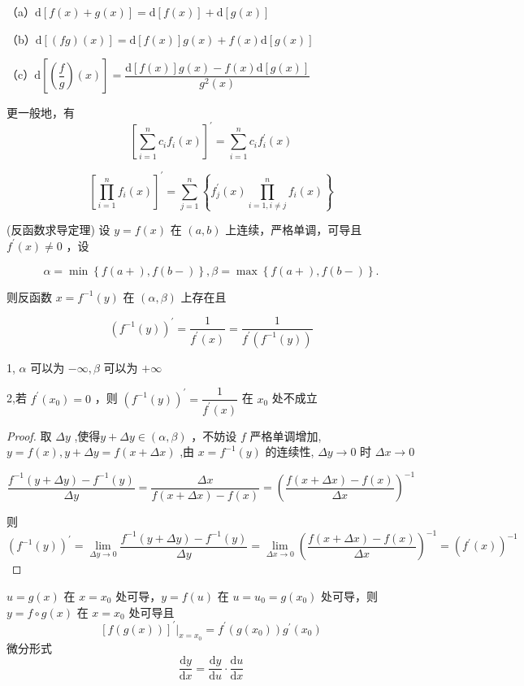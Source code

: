 （a）$\mathrm{d}[f(x)+g(x)]=\mathrm{d}[f(x)]+\mathrm{d}[g(x)]$

（b）$\mathrm{d}[(f g)(x)]=\mathrm{d}[f(x)] g(x)+f(x) \mathrm{d}[g(x)]$

（c）$\mathrm{d}\left[\left(\dfrac{f}{g}\right)(x)\right]=\dfrac{\mathrm{d}[f(x)] g(x)-f(x) \mathrm{d}[g(x)]}{g^2(x)}$

更一般地，有 $$\left[\sum_{i=1}^n c_i f_i(x)\right]^{\prime}=\sum_{i=1}^n c_i f_i^{\prime}(x)$$

$$
\left[\prod_{i=1}^n f_i(x)\right]^{\prime}=\sum_{j=1}^n\left\{f_j^{\prime}(x) \prod_{i=1, i\neq j}^n f_i(x)\right\}
$$
\begin{theorem}(反函数求导定理)
	设 $y=f(x)$ 在 $(a, b)$ 上连续，严格单调，可导且 $f^{\prime}(x) \neq 0$ ，设
	
	$$
	\alpha=\min \left\{f(a+), f(b-)\right\}, \beta=\max\left\{f(a+), f(b-)\right\}  .
	$$
	
	
	则反函数 $x=f^{-1}(y)$ 在 $(\alpha, \beta)$ 上存在且
	
	$$
	\left(f^{-1}(y)\right)^{\prime}=\frac{1}{f^{\prime}(x)}=\frac{1}{f^{\prime}\left(f^{-1}(y)\right)}
	$$
\end{theorem}
1, $ \alpha$ 可以为 $-\infty, \beta$ 可以为 $+\infty $ 

2,若 $f^{\prime}\left(x_0\right)=0$ ，则 $(f^{-1}(y))^{\prime}=\dfrac{1}{f^{\prime}(x)}$ 在 $x_0$ 处不成立
\begin{proof}
	取 $\Delta y$ ,使得$y+\Delta y \in(\alpha, \beta)$ ，不妨设 $f$ 严格单调增加,$y=f(x), y+\Delta y=f(x+\Delta x)$ ,由 $x=f^{-1}(y)$ 的连续性, $\Delta y \rightarrow 0$ 时 $\Delta x \rightarrow 0$
	
	$$
	\frac{f^{-1}(y+\Delta y)-f^{-1}(y)}{\Delta y}=\frac{\Delta x}{f(x+\Delta x)-f(x)}=\left(\frac{f(x+\Delta x)-f(x)}{\Delta x}\right)^{-1}
	$$
	
	则
	$$
	\left(f^{-1}(y)\right)^{\prime}=\lim _{\Delta y \rightarrow 0} \frac{f^{-1}(y+\Delta y)-f^{-1}(y)}{\Delta y}=\lim _{\Delta x \rightarrow 0}\left(\frac{f(x+\Delta x)-f(x)}{\Delta x}\right)^{-1}=\left(f^{\prime}(x)\right)^{-1}
	$$
\end{proof}
\begin{proposition}
	$u=g(x)$ 在 $x=x_0$ 处可导，$y=f(u)$ 在 $u=u_0=g\left(x_0\right)$ 处可导，则 $y=f\circ g(x)$
	在 $x=x_0$ 处可导且
	$$
	[f(g(x))]^{\prime}|_{x=x_0}=f^{\prime}\left(g\left(x_0\right)\right) g^{\prime}\left(x_0\right)
	$$
	微分形式
	$$
	\frac{\mathrm{d} y}{\mathrm{d}  x}=\frac{\mathrm{d}  y}{\mathrm{d}  u} \cdot \frac{\mathrm{d}  u}{\mathrm{d}  x}
	$$	
\end{proposition}

